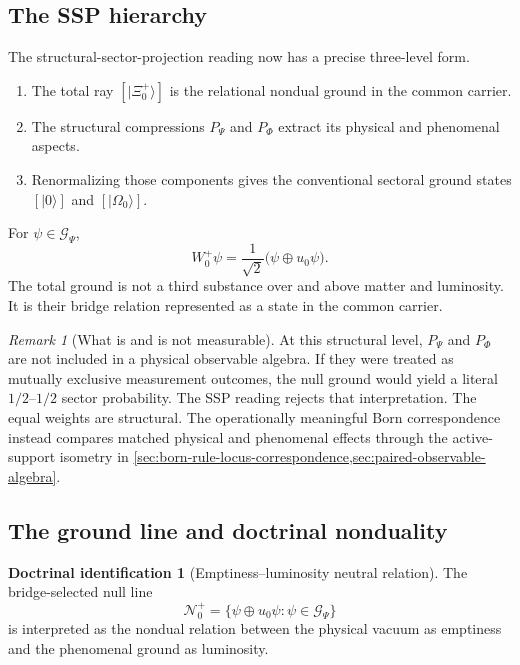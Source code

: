 \documentclass[11pt,reqno]{scrartcl}
\newcommand{\PP}{P_{\Psi}}
\newcommand{\PF}{P_{\Phi}}
\newcommand{\GzeroP}{\mathscr G_{\Psi}}
\newcommand{\uzero}{u_{0}}
\newcommand{\NzeroPlus}{\mathscr N_{0}^{+}}
\newcommand{\WzeroPlus}{W_{0}^{+}}
\newcommand{\ket}[1]{\lvert #1\rangle}
\theoremstyle{plain}
\theoremstyle{definition}
\newtheorem{identification}[identification]{Doctrinal identification}
\theoremstyle{remark}
\newtheorem{remark}[remark]{Remark}
\begin{document}
\subsection{The SSP hierarchy}

The structural-sector-projection reading now has a precise three-level form.

\begin{enumerate}[label=(\roman*)]
  \item The total ray \([\ket{\Xi_0^+}]\) is the relational nondual ground in
  the common carrier.
  \item The structural compressions \(\PP\) and \(\PF\) extract its physical
  and phenomenal aspects.
  \item Renormalizing those components gives the conventional sectoral ground
  states \([\ket0]\) and \([\ket{\Omega_0}]\).
\end{enumerate}

For \(\psi\in\GzeroP\),
\begin{equation}
  \WzeroPlus\psi
  =\frac1{\sqrt2}
   \bigl(\psi\oplus\uzero\psi\bigr).
  \label{eq:W0-SSP-summary}
\end{equation}
The total ground is not a third substance over and above matter and
luminosity.  It is their bridge relation represented as a state in the common
carrier.

\begin{remark}[What is and is not measurable]
\label{rem:ground-measurability}
At this structural level, \(\PP\) and \(\PF\) are not included in a physical
observable algebra.
If they were treated as mutually exclusive measurement outcomes, the null
ground would yield a literal \(1/2\)--\(1/2\) sector probability.  The SSP
reading rejects that interpretation.  The equal weights are structural.  The
operationally meaningful Born correspondence instead compares matched
physical and phenomenal effects through the active-support isometry in
\cref{sec:born-rule-locus-correspondence,sec:paired-observable-algebra}.
\end{remark}

\subsection{The ground line and doctrinal nonduality}

\begin{identification}[Emptiness--luminosity neutral relation]
\label{id:emptiness-luminosity-neutral-relation}
The bridge-selected null line
\begin{equation}
  \NzeroPlus
  =\{\psi\oplus\uzero\psi:\psi\in\GzeroP\}
  \label{eq:doctrinal-neutral-line}
\end{equation}
is interpreted as the nondual relation between the physical vacuum as
emptiness and the phenomenal ground as luminosity.
\end{identification}
\end{document}

